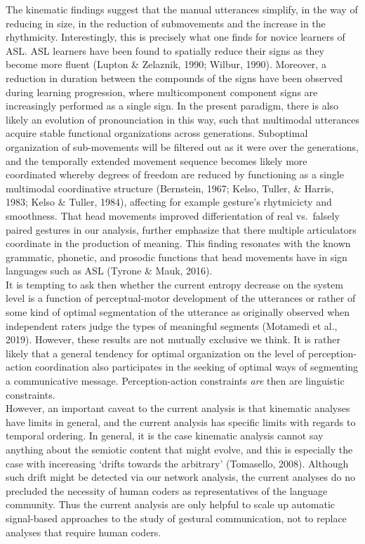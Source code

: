 \documentclass[
  man, noextraspace,floatsintext]{apa6}
\begin{document}
The kinematic findings suggest that the manual utterances simplify, in the way of reducing in size, in the reduction of submovements and the increase in the rhythmicity. Interestingly, this is precisely what one finds for novice learners of ASL. ASL learners have been found to spatially reduce their signs as they become more fluent (Lupton \& Zelaznik, 1990; Wilbur, 1990). Moreover, a reduction in duration between the compounds of the signs have been observed during learning progression, where multicomponent component signs are increasingly performed as a single sign. In the present paradigm, there is also likely an evolution of pronounciation in this way, such that multimodal utterances acquire stable functional organizations across generations. Suboptimal organization of sub-movements will be filtered out as it were over the generations, and the temporally extended movement sequence becomes likely more coordinated whereby degrees of freedom are reduced by functioning as a single multimodal coordinative structure (Bernstein, 1967; Kelso, Tuller, \& Harris, 1983; Kelso \& Tuller, 1984), affecting for example gesture's rhytmicicty and smoothness. That head movements improved differientation of real vs.~falsely paired gestures in our analysis, further emphasize that there multiple articulators coordinate in the production of meaning. This finding resonates with the known grammatic, phonetic, and prosodic functions that head movements have in sign languages such as ASL (Tyrone \& Mauk, 2016).\\
It is tempting to ask then whether the current entropy decrease on the system level is a function of perceptual-motor development of the utterances or rather of some kind of optimal segmentation of the utterance as originally observed when independent raters judge the types of meaningful segments (Motamedi et al., 2019). However, these results are not mutually exclusive we think. It is rather likely that a general tendency for optimal organization on the level of perception-action coordination also participates in the seeking of optimal ways of segmenting a communicative message. Perception-action constraints \emph{are} then are linguistic constraints.\\
However, an important caveat to the current analysis is that kinematic analyses have limits in general, and the current analysis has specific limits with regards to temporal ordering. In general, it is the case kinematic analysis cannot say anything about the semiotic content that might evolve, and this is especially the case with incereasing `drifts towards the arbitrary' (Tomasello, 2008). Although such drift might be detected via our network analysis, the current analyses do no precluded the necessity of human coders as representatives of the language community. Thus the current analysis are only helpful to scale up automatic signal-based approaches to the study of gestural communication, not to replace analyses that require human coders.\\
\end{document}
